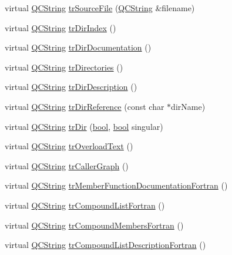 \begin{DoxyCompactItemize}
\item 
virtual \hyperlink{class_q_c_string}{Q\+C\+String} \hyperlink{class_translator_persian_a7dca0aca24a6c2c76760fb85e95a1b9a}{tr\+Source\+File} (\hyperlink{class_q_c_string}{Q\+C\+String} \&filename)
\item 
virtual \hyperlink{class_q_c_string}{Q\+C\+String} \hyperlink{class_translator_persian_a20accdb49d53063a089c569419215b4e}{tr\+Dir\+Index} ()
\item 
virtual \hyperlink{class_q_c_string}{Q\+C\+String} \hyperlink{class_translator_persian_a3100df4d9e74a6ae67a17f70268caaf2}{tr\+Dir\+Documentation} ()
\item 
virtual \hyperlink{class_q_c_string}{Q\+C\+String} \hyperlink{class_translator_persian_a8c198763218e8e9a6f391f409e1146f5}{tr\+Directories} ()
\item 
virtual \hyperlink{class_q_c_string}{Q\+C\+String} \hyperlink{class_translator_persian_a1e906fbdd8542727e85517dde013d53b}{tr\+Dir\+Description} ()
\item 
virtual \hyperlink{class_q_c_string}{Q\+C\+String} \hyperlink{class_translator_persian_a6155500222ad9ad5047c8933dc290dfe}{tr\+Dir\+Reference} (const char $\ast$dir\+Name)
\item 
virtual \hyperlink{class_q_c_string}{Q\+C\+String} \hyperlink{class_translator_persian_a7ed31c1aaa90edc6cceb4ab37c873462}{tr\+Dir} (\hyperlink{qglobal_8h_a1062901a7428fdd9c7f180f5e01ea056}{bool}, \hyperlink{qglobal_8h_a1062901a7428fdd9c7f180f5e01ea056}{bool} singular)
\item 
virtual \hyperlink{class_q_c_string}{Q\+C\+String} \hyperlink{class_translator_persian_a8e0b7cf24f2cf4b77158904941cfe4f8}{tr\+Overload\+Text} ()
\item 
virtual \hyperlink{class_q_c_string}{Q\+C\+String} \hyperlink{class_translator_persian_a598d36e9b6fe91aec00a1336a644f7dd}{tr\+Caller\+Graph} ()
\item 
virtual \hyperlink{class_q_c_string}{Q\+C\+String} \hyperlink{class_translator_persian_a2bd374a56b76f0d9559c265cd0f7d9ba}{tr\+Member\+Function\+Documentation\+Fortran} ()
\item 
virtual \hyperlink{class_q_c_string}{Q\+C\+String} \hyperlink{class_translator_persian_a1dac216e341c67144e19d96de69a5321}{tr\+Compound\+List\+Fortran} ()
\item 
virtual \hyperlink{class_q_c_string}{Q\+C\+String} \hyperlink{class_translator_persian_a0e8a22b068be61351086db8eefdde1d0}{tr\+Compound\+Members\+Fortran} ()
\item 
virtual \hyperlink{class_q_c_string}{Q\+C\+String} \hyperlink{class_translator_persian_a338b1e1fff787968f75c402eee15e0d6}{tr\+Compound\+List\+Description\+Fortran} ()

\end{DoxyCompactItemize}
